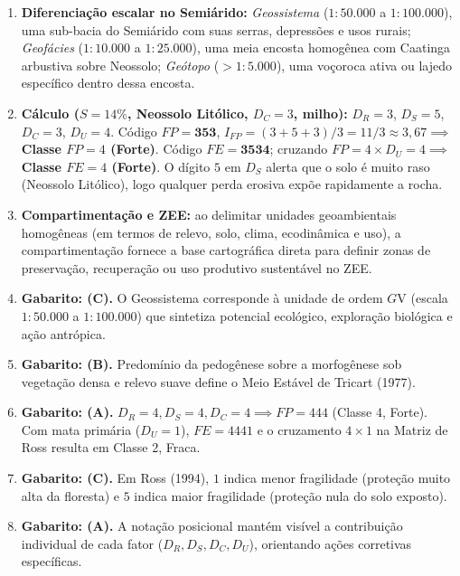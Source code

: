 \begin{boxGabarito}
\begin{enumerate}[leftmargin=1.8em, itemsep=3.5pt]
  \item \textbf{Diferenciação escalar no Semiárido:} \emph{Geossistema} ($1:50.000$ a $1:100.000$), uma sub-bacia do Semiárido com suas serras, depressões e usos rurais; \emph{Geofácies} ($1:10.000$ a $1:25.000$), uma meia encosta homogênea com Caatinga arbustiva sobre Neossolo; \emph{Geótopo} ($>1:5.000$), uma voçoroca ativa ou lajedo específico dentro dessa encosta.

  \item \textbf{Cálculo ($S=14\%$, Neossolo Litólico, $D_C=3$, milho):} $D_R=3$, $D_S=5$, $D_C=3$, $D_U=4$. Código $FP = \mathbf{353}$, $I_{FP} = (3+5+3)/3 = 11/3 \approx 3{,}67 \implies$ \textbf{Classe $FP = 4$ (Forte)}. Código $FE = \mathbf{3534}$; cruzando $FP=4 \times D_U=4 \implies$ \textbf{Classe $FE = 4$ (Forte)}. O dígito $5$ em $D_S$ alerta que o solo é muito raso (Neossolo Litólico), logo qualquer perda erosiva expõe rapidamente a rocha.

  \item \textbf{Compartimentação e ZEE:} ao delimitar unidades geoambientais homogêneas (em termos de relevo, solo, clima, ecodinâmica e uso), a compartimentação fornece a base cartográfica direta para definir zonas de preservação, recuperação ou uso produtivo sustentável no ZEE.

  \item \textbf{Gabarito: (C).} O Geossistema corresponde à unidade de ordem $G\text{V}$ (escala $1:50.000$ a $1:100.000$) que sintetiza potencial ecológico, exploração biológica e ação antrópica.

  \item \textbf{Gabarito: (B).} Predomínio da pedogênese sobre a morfogênese sob vegetação densa e relevo suave define o Meio Estável de Tricart (1977).

  \item \textbf{Gabarito: (A).} $D_R=4, D_S=4, D_C=4 \implies FP = 444$ (Classe 4, Forte). Com mata primária ($D_U=1$), $FE = 4441$ e o cruzamento $4 \times 1$ na Matriz de Ross resulta em Classe 2, Fraca.

  \item \textbf{Gabarito: (C).} Em Ross (1994), $1$ indica menor fragilidade (proteção muito alta da floresta) e $5$ indica maior fragilidade (proteção nula do solo exposto).

  \item \textbf{Gabarito: (A).} A notação posicional mantém visível a contribuição individual de cada fator ($D_R, D_S, D_C, D_U$), orientando ações corretivas específicas.


\end{enumerate}
\end{boxGabarito}
